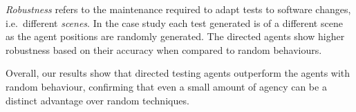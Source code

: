 \documentclass[letterpaper, 10 pt, journal, twoside]{IEEEtran}
\begin{document}
\textit{Robustness} refers to the maintenance required to adapt tests to software changes, i.e.\ different \textit{scenes}. In the case study each test generated is of a different scene as the agent positions are randomly generated. The directed agents show higher robustness based on their accuracy when compared to random behaviours. 





Overall, our results show that directed testing agents outperform the agents with random behaviour, confirming that even a small amount of agency can be a distinct advantage over random techniques. 
%
\end{document}
